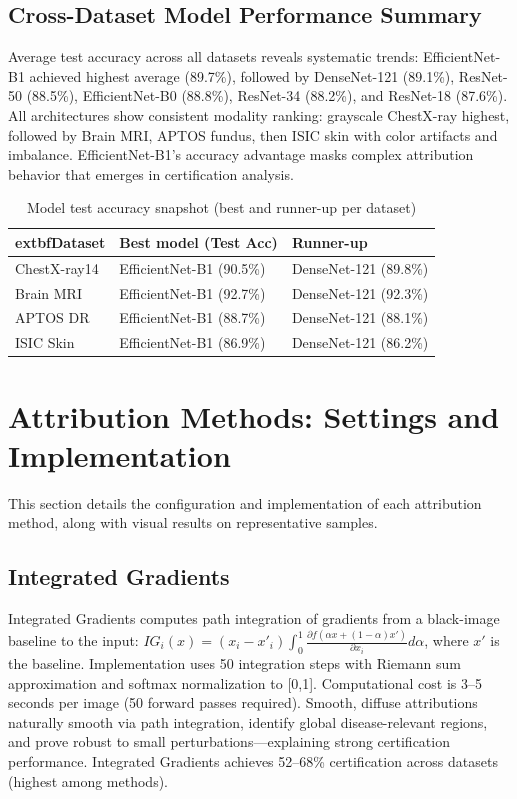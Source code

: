 \documentclass[11pt]{article}
\begin{document}
\subsection{Cross-Dataset Model Performance Summary}

Average test accuracy across all datasets reveals systematic trends: EfficientNet-B1 achieved highest average (89.7\%), followed by DenseNet-121 (89.1\%), ResNet-50 (88.5\%), EfficientNet-B0 (88.8\%), ResNet-34 (88.2\%), and ResNet-18 (87.6\%). All architectures show consistent modality ranking: grayscale ChestX-ray highest, followed by Brain MRI, APTOS fundus, then ISIC skin with color artifacts and imbalance. EfficientNet-B1's accuracy advantage masks complex attribution behavior that emerges in certification analysis.

\begin{table}[h!]
\centering
\caption{Model test accuracy snapshot (best and runner-up per dataset)}
\begin{tabularx}{\linewidth}{|X|X|X|}
\hline
	extbf{Dataset} & \textbf{Best model (Test Acc)} & \textbf{Runner-up} \\
\hline
ChestX-ray14 & EfficientNet-B1 (90.5\%) & DenseNet-121 (89.8\%) \\
\hline
Brain MRI & EfficientNet-B1 (92.7\%) & DenseNet-121 (92.3\%) \\
\hline
APTOS DR & EfficientNet-B1 (88.7\%) & DenseNet-121 (88.1\%) \\
\hline
ISIC Skin & EfficientNet-B1 (86.9\%) & DenseNet-121 (86.2\%) \\
\hline
\end{tabularx}
\label{tab:acc_summary}
\end{table}

\newpage

\section{Attribution Methods: Settings and Implementation}

This section details the configuration and implementation of each attribution method, along with visual results on representative samples.

\subsection{Integrated Gradients}

Integrated Gradients computes path integration of gradients from a black-image baseline to the input: $IG_i(x) = (x_i - x'_i) \int_0^1 \frac{\partial f(\alpha x + (1-\alpha) x')}{\partial x_i} d\alpha$, where $x'$ is the baseline. Implementation uses 50 integration steps with Riemann sum approximation and softmax normalization to [0,1]. Computational cost is 3–5 seconds per image (50 forward passes required). Smooth, diffuse attributions naturally smooth via path integration, identify global disease-relevant regions, and prove robust to small perturbations—explaining strong certification performance. Integrated Gradients achieves 52–68\% certification across datasets (highest among methods).
\end{document}
